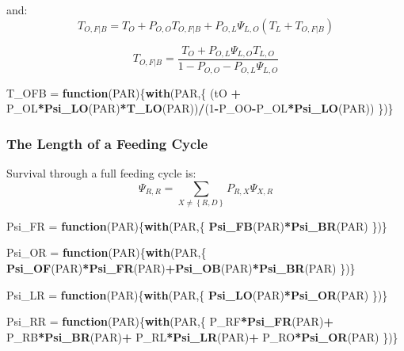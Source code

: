 \documentclass[]{article}
\newenvironment{Shaded}{\begin{snugshade}}{\end{snugshade}}
\newcommand{\ControlFlowTok}[1]{\textcolor[rgb]{0.13,0.29,0.53}{\textbf{#1}}}
\newcommand{\DecValTok}[1]{\textcolor[rgb]{0.00,0.00,0.81}{#1}}
\newcommand{\KeywordTok}[1]{\textcolor[rgb]{0.13,0.29,0.53}{\textbf{#1}}}
\newcommand{\NormalTok}[1]{#1}
\newcommand{\OperatorTok}[1]{\textcolor[rgb]{0.81,0.36,0.00}{\textbf{#1}}}
\newcommand{\StringTok}[1]{\textcolor[rgb]{0.31,0.60,0.02}{#1}}
\begin{document}
and: \[
T_{O,F|B} = T_O + P_{O,O} T_{O,F|B} + P_{O,L} \Psi_{L,O} \left(T_L + T_{O,F|B} \right)
\]

\[
T_{O,F|B}= \frac{T_O  + P_{O,L} \Psi_{L,O} T_{L,O}}{1 - P_{O,O} - P_{O,L} \Psi_{L,O}}
\]

\begin{Shaded}
\begin{Highlighting}[]
\NormalTok{T_OFB =}\StringTok{ }\ControlFlowTok{function}\NormalTok{(PAR)\{}\KeywordTok{with}\NormalTok{(PAR,\{}
\NormalTok{  (tO }\OperatorTok{+}\StringTok{ }\NormalTok{P_OL}\OperatorTok{*}\KeywordTok{Psi_LO}\NormalTok{(PAR)}\OperatorTok{*}\KeywordTok{T_LO}\NormalTok{(PAR))}\OperatorTok{/}\NormalTok{(}\DecValTok{1}\OperatorTok{-}\NormalTok{P_OO}\OperatorTok{-}\NormalTok{P_OL}\OperatorTok{*}\KeywordTok{Psi_LO}\NormalTok{(PAR))}
\NormalTok{\})\}}
\end{Highlighting}
\end{Shaded}

\hypertarget{the-length-of-a-feeding-cycle}{%
\subsubsection{The Length of a Feeding
Cycle}\label{the-length-of-a-feeding-cycle}}

Survival through a full feeding cycle is:
\[\Psi_{R,R} = \sum_{X \neq \left\{R,D\right\}} P_{R,X} \Psi_{X,R}\]

\begin{Shaded}
\begin{Highlighting}[]
\NormalTok{Psi_FR =}\StringTok{ }\ControlFlowTok{function}\NormalTok{(PAR)\{}\KeywordTok{with}\NormalTok{(PAR,\{}
  \KeywordTok{Psi_FB}\NormalTok{(PAR)}\OperatorTok{*}\KeywordTok{Psi_BR}\NormalTok{(PAR)}
\NormalTok{\})\}}

\NormalTok{Psi_OR =}\StringTok{ }\ControlFlowTok{function}\NormalTok{(PAR)\{}\KeywordTok{with}\NormalTok{(PAR,\{}
  \KeywordTok{Psi_OF}\NormalTok{(PAR)}\OperatorTok{*}\KeywordTok{Psi_FR}\NormalTok{(PAR)}\OperatorTok{+}\KeywordTok{Psi_OB}\NormalTok{(PAR)}\OperatorTok{*}\KeywordTok{Psi_BR}\NormalTok{(PAR)}
\NormalTok{\})\}}

\NormalTok{Psi_LR =}\StringTok{ }\ControlFlowTok{function}\NormalTok{(PAR)\{}\KeywordTok{with}\NormalTok{(PAR,\{}
  \KeywordTok{Psi_LO}\NormalTok{(PAR)}\OperatorTok{*}\KeywordTok{Psi_OR}\NormalTok{(PAR)}
\NormalTok{\})\}}

\NormalTok{Psi_RR =}\StringTok{ }\ControlFlowTok{function}\NormalTok{(PAR)\{}\KeywordTok{with}\NormalTok{(PAR,\{}
\NormalTok{  P_RF}\OperatorTok{*}\KeywordTok{Psi_FR}\NormalTok{(PAR)}\OperatorTok{+}
\StringTok{  }\NormalTok{P_RB}\OperatorTok{*}\KeywordTok{Psi_BR}\NormalTok{(PAR)}\OperatorTok{+}
\StringTok{  }\NormalTok{P_RL}\OperatorTok{*}\KeywordTok{Psi_LR}\NormalTok{(PAR)}\OperatorTok{+}
\StringTok{  }\NormalTok{P_RO}\OperatorTok{*}\KeywordTok{Psi_OR}\NormalTok{(PAR)}
\NormalTok{\})\}}
\end{Highlighting}
\end{Shaded}
\end{document}
